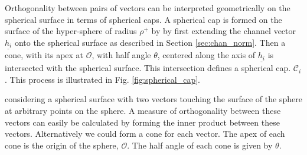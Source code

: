 Orthogonality between pairs of vectors can be interpreted geometrically on the spherical surface in terms of spherical caps. A spherical cap is formed on the surface of the hyper-sphere of radius $\rho^+$ by by first extending the channel vector $\underline{h_i}$ onto the spherical surface as described in Section \ref{sec:chan_norm}. Then a cone, with its apex at $\mathcal{O}$, with half angle $\theta$, centered along the axis of $\underline{h_i}$ is intersected with the spherical surface. This intersection defines a spherical cap. $\mathcal{C}_i$. This process is illustrated in Fig. \ref{fig:spherical_cap}. 

considering a spherical surface with two vectors touching the surface of the sphere at arbitrary points on the sphere. A measure of orthogonality between these vectors can easily be calculated by forming the inner product between these vectors. Alternatively we could form a cone for each vector. The apex of each cone is the origin of the sphere, $\mathcal{O}$. The half angle of each cone is given by $\theta$.


